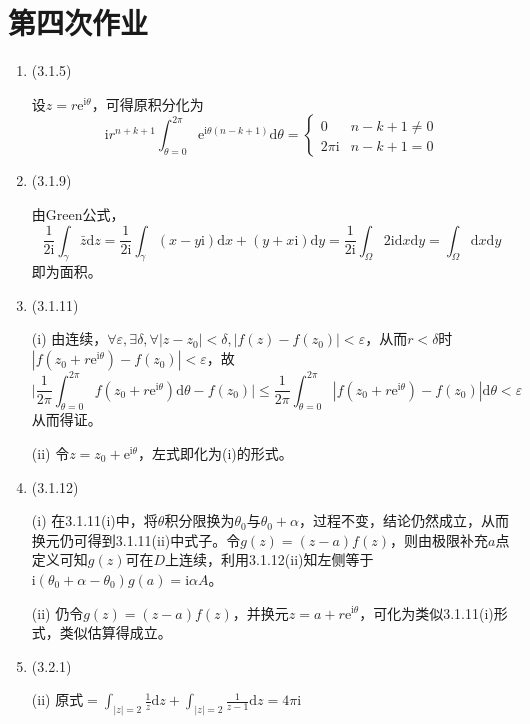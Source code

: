 \documentclass[a4paper,UTF8,fontset=windows]{ctexart}
\begin{document}
\section{第四次作业}
\begin{enumerate}
    \item (3.1.5)
    
    设$z=r\mathrm{e}^{\mathrm{i}\theta}$，可得原积分化为
    \[\mathrm{i}r^{n+k+1}\int_{\theta=0}^{2\pi}\mathrm{e}^{\mathrm{i}\theta(n-k+1)}\mathrm{d}\theta=\begin{cases}0&n-k+1\ne0\\2\pi\mathrm{i}&n-k+1=0\end{cases}\]
    
    \item (3.1.9)
    
    由Green公式，
    \[\frac{1}{2\mathrm{i}}\int_\gamma\bar{z}\mathrm{d}z=\frac{1}{2\mathrm{i}}\int_\gamma(x-y\mathrm{i})\mathrm{d}x+(y+x\mathrm{i})\mathrm{d}y=\frac{1}{2\mathrm{i}}\int_\Omega 2\mathrm{i}\mathrm{d}x\mathrm{d}y=\int_\Omega\mathrm{d}x\mathrm{d}y\]
    即为面积。
    
    \item (3.1.11)
    
    (i) 由连续，$\forall\varepsilon,\exists\delta,\forall |z-z_0|<\delta,|f(z)-f(z_0)|<\varepsilon$，从而$r<\delta$时$|f(z_0+r\mathrm{e}^{\mathrm{i}\theta})-f(z_0)|<\varepsilon$，故
    \[\bigg|\frac{1}{2\pi}\int_{\theta=0}^{2\pi}f(z_0+r\mathrm{e}^{\mathrm{i}\theta})\mathrm{d}\theta-f(z_0)\bigg|\le\frac{1}{2\pi}\int_{\theta=0}^{2\pi}|f(z_0+r\mathrm{e}^{\mathrm{i}\theta})-f(z_0)|\mathrm{d}\theta<\varepsilon\]
    从而得证。
    
    (ii) 令$z=z_0+\mathrm{e}^{\mathrm{i}\theta}$，左式即化为(i)的形式。
    
    \item (3.1.12)
    
    (i) 在3.1.11(i)中，将$\theta$积分限换为$\theta_0$与$\theta_0+\alpha$，过程不变，结论仍然成立，从而换元仍可得到3.1.11(ii)中式子。令$g(z)=(z-a)f(z)$，则由极限补充$a$点定义可知$g(z)$可在$D$上连续，利用3.1.12(ii)知左侧等于$\mathrm{i}(\theta_0+\alpha-\theta_0)g(a)=\mathrm{i}\alpha A$。
    
    (ii) 仍令$g(z)=(z-a)f(z)$，并换元$z=a+r\mathrm{e}^{\mathrm{i}\theta}$，可化为类似3.1.11(i)形式，类似估算得成立。
    
    \item (3.2.1)
    
    (ii) 原式$=\int_{|z|=2}\frac{1}{z}\mathrm{d}z+\int_{|z|=2}\frac{1}{z-1}\mathrm{d}z=4\pi\mathrm{i}$
    

\end{enumerate}
\end{document}
